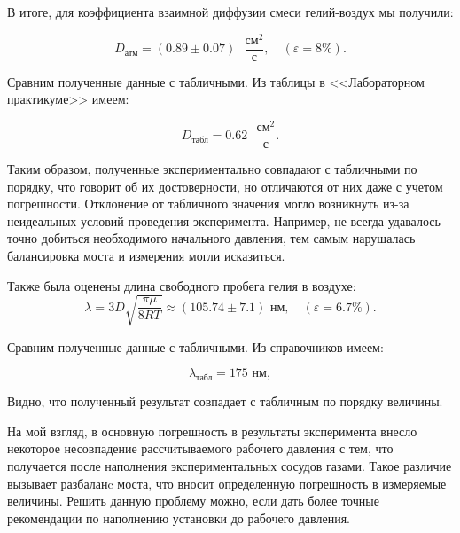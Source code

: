 \documentclass[a4paper, 12pt]{article}
\begin{document}
В итоге, для коэффициента взаимной диффузии смеси гелий-воздух мы получили:

\[{D_\text{атм} = (0.89\pm0.07) \text{ } \frac{\text{см}^2}{\text{с}}}, \quad (\varepsilon = 8\%). \]

Сравним полученные данные с табличными. Из таблицы в <<Лабораторном практикуме>> имеем:

\[ D_\text{табл} = 0.62 \text{ } \frac{\text{см}^2}{\text{с}}. \]

Таким образом, полученные экспериментально совпадают с табличными по порядку, что говорит об их достоверности, но отличаются от них даже с учетом погрешности. Отклонение от табличного значения могло возникнуть из-за неидеальных условий проведения эксперимента. Например, не всегда удавалось точно добиться необходимого начального давления, тем самым нарушалась балансировка моста и измерения могли исказиться.

Также была оценены длина свободного пробега гелия в воздухе:
\[{\lambda = 3D\sqrt{\dfrac{\pi\mu}{8RT}} \approx (105.74 \pm 7.1) \text{ нм}}, \quad (\varepsilon = 6.7\%).\]

Сравним полученные данные с табличными. Из справочников имеем:

\[ \lambda_\text{табл} = 175 \text{ нм}, \]

Видно, что полученный результат совпадает с табличным по порядку величины.

На мой взгляд, в основную погрешность в результаты эксперимента внесло некоторое несовпадение рассчитываемого рабочего давления с тем, что получается после наполнения экспериментальных сосудов газами. Такое различие вызывает разбаланc моста, что вносит определенную погрешность в измеряемые величины. Решить данную проблему можно, если дать более точные рекомендации по наполнению установки до рабочего давления.
\end{document}
